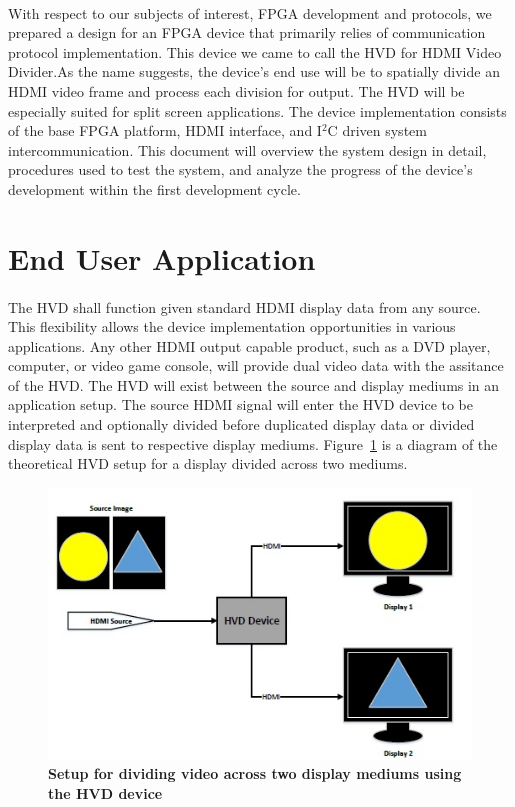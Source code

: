 \documentclass[pdftex,12pt,a4paper]{article}
\begin{document}
\paragraph{}
With respect to our subjects of interest, FPGA development and protocols, we prepared a design for an FPGA device that primarily relies of communication protocol implementation. This device we came to call the HVD for HDMI Video Divider.As the name suggests, the device's end use will be to spatially divide an HDMI video frame and process each division for output. The HVD will be especially suited for split screen applications. The device implementation  consists of the base FPGA platform, HDMI interface, and I$^2$C driven system intercommunication. This document will overview the system design in detail, procedures used to test the system, and analyze the progress of the device's development within the first development cycle.

\section{End User Application}

\paragraph{}
The HVD shall function given standard HDMI display data from any source. This flexibility allows the device implementation opportunities in various applications. Any other HDMI output capable product, such as a DVD player, computer, or video game console, will provide dual video data with the assitance of the HVD. The HVD will exist between the source and display mediums in an application setup. The source HDMI signal will enter the HVD device to be interpreted and optionally divided before duplicated display data or divided display data is sent to respective display mediums. Figure~\ref{fig:use} is a diagram of the theoretical HVD setup for a display divided across two mediums.

\begin{figure}[H]
\centering
\includegraphics{UserModel.jpg}
\caption{\textbf{Setup for dividing video across two display mediums using the HVD device}}
\label{fig:use}
\end{figure}
\end{document}
